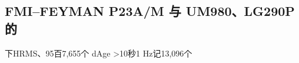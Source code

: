 \documentclass[11pt,a4paper]{article}
\numberwithin{equation}{section}
\numberwithin{figure}{section}
\begin{document}
\subsection{FMI–FEYMAN P23A/\allowbreak{}M {\cjkfont 与}\allowbreak{} UM980{\cjkfont 、}\allowbreak{}LG290P {\cjkfont 的}\allowbreak{}}

{\cjkfont 下}\allowbreak{}HRMS{\cjkfont 、}\allowbreak{}95{\cjkfont 百}\allowbreak{}7,655{\cjkfont 个}\allowbreak{} dAge >10{\cjkfont 秒}\allowbreak{}1 Hz{\cjkfont 记}\allowbreak{}13,096{\cjkfont 个}\allowbreak{}
\end{document}
